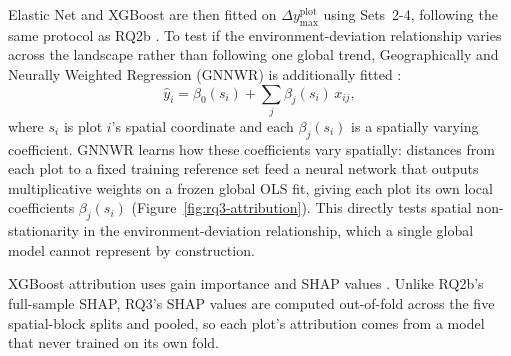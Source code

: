 \documentclass[logo,msc,ai]{infthesis}           %
\begin{document}
Elastic Net and XGBoost are then fitted on $\Delta y_{\max}^{\text{plot}}$ using Sets~2-4, following the same protocol as RQ2b \cite{zou2005Regularization_C4_NN, chen2016XGBoost_C4_NN}. To test if the environment-deviation relationship varies across the landscape rather than following one global trend, Geographically and Neurally Weighted Regression (GNNWR) is additionally fitted \cite{du2020Geographically_C6_GWR}:
\begin{equation}
\hat{y}_i = \beta_0(s_i) + \sum_j \beta_j(s_i)\,x_{ij},
\label{eq:gnnwr}
\end{equation}
where $s_i$ is plot $i$'s spatial coordinate and each $\beta_j(s_i)$ is a spatially varying coefficient. GNNWR learns how these coefficients vary spatially: distances from each plot to a fixed training reference set feed a neural network that outputs multiplicative weights on a frozen global OLS fit, giving each plot its own local coefficients $\beta_j(s_i)$ (Figure~\ref{fig:rq3-attribution}). This directly tests spatial non-stationarity in the environment-deviation relationship, which a single global model cannot represent by construction.

XGBoost attribution uses gain importance and SHAP values \cite{lundberg2017}. Unlike RQ2b's full-sample SHAP, RQ3's SHAP values are computed out-of-fold across the five spatial-block splits and pooled, so each plot's attribution comes from a model that never trained on its own fold. 

\end{document}
